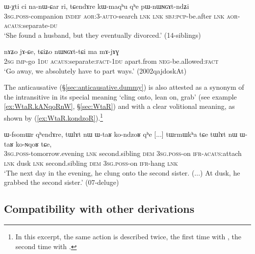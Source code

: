 \begin{exe}
\ex \label{ex:pWnWNGAtndZi}
\gll ɯ-χti ci na-nɯ-ɕar ri, tɕendɤre kɯ-maqʰu qʰe pɯ-nɯɴɢɤt-ndʑi \\
\textsc{3sg}.\textsc{poss}-companion \textsc{indef} \textsc{aor}:3\flobv{}-\textsc{auto}-search \textsc{lnk} \textsc{lnk} \textsc{sbj}:\textsc{pcp}-be.after \textsc{lnk} \textsc{aor}-\textsc{acaus}:separate-\textsc{du} \\
\glt `She found a husband, but they eventually divorced.' (14-siblings) 
\end{exe}

\begin{exe}
\ex \label{ex:nWNGAttCi}
\gll nɤʑo jɤ-ɕe, tɕiʑo nɯɴɢɤt-tɕi ma mɤ-jɤɣ \\
\textsc{2sg} \textsc{imp}-go \textsc{1du}  \textsc{acaus}:separate:\textsc{fact}-\textsc{1du} apart.from \textsc{neg}-be.allowed:\textsc{fact} \\
\glt `Go away, we absolutely have to part ways.' (2002qajdoskAt)
\end{exe}

The anticausative  (§\ref{sec:anticausative.dummy}) is also attested as a synonym of the intransitive  in its special meaning `cling onto, lean on, grab' (see example \ref{ex:WtaR.kANqoRnW}, §\ref{sec:WtaR}) and with a clear volitional meaning, as shown by (\ref{ex:WtaR.kondzoR}).\footnote{In this excerpt, the same action is described twice, the first time with , the second time with .}
 
\begin{exe}
\ex \label{ex:WtaR.kondzoR}
\gll  ɯ-fsomɯr qʰendɤre, tɯlɤt nɯ ɯ-taʁ ko-ndzoʁ qʰe [...] tɯrmɯkʰa tɕe tɯlɤt nɯ ɯ-taʁ ko-ɴqoʁ tɕe, \\
\textsc{3sg}.\textsc{poss}-tomorrow.evening \textsc{lnk} second.sibling \textsc{dem} \textsc{3sg}.\textsc{poss}-on \textsc{ifr}-\textsc{acaus}:attach \textsc{lnk} { } dusk \textsc{lnk} second.sibling \textsc{dem} \textsc{3sg}.\textsc{poss}-on \textsc{ifr}-hang \textsc{lnk} \\
\glt `The next day in the evening, he clung onto the second sister. (...) At dusk, he grabbed the second sister.' (07-deluge)  
\end{exe}

\subsection{Compatibility with other derivations} \label{sec:anticausative.other.derivations}

